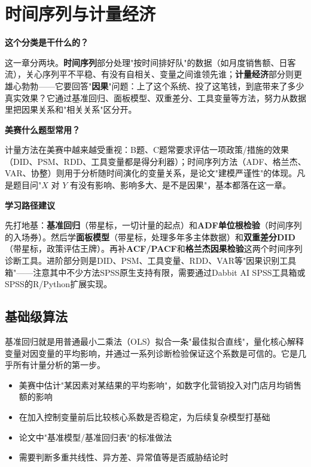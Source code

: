 \chapter{时间序列与计量经济}

\begin{chapteroverview}
\textbf{这个分类是干什么的？}

这一章分两块。\textbf{时间序列}部分处理"按时间排好队"的数据（如月度销售额、日客流），关心序列平不平稳、有没有自相关、变量之间谁领先谁；\textbf{计量经济}部分则更雄心勃勃——它要回答"\textbf{因果}"问题：上了这个系统、投了这笔钱，到底带来了多少真实效果？它通过基准回归、面板模型、双重差分、工具变量等方法，努力从数据里把因果关系和"相关关系"区分开。

\textbf{美赛什么题型常用？}

计量方法在美赛中越来越受重视：B题、C题常要求评估一项政策/措施的效果（DID、PSM、RDD、工具变量都是得分利器）；时间序列方法（ADF、格兰杰、VAR、协整）则用于分析随时间演化的变量关系，是论文"建模严谨性"的体现。凡是题目问"$X$ 对 $Y$ 有没有影响、影响多大、是不是因果"，基本都落在这一章。

\textbf{学习路径建议}

先打地基：\textbf{基准回归}（带星标，一切计量的起点）和\textbf{ADF单位根检验}（时间序列的入场券）。然后学\textbf{面板模型}（带星标，处理多年多主体数据）和\textbf{双重差分DID}（带星标，政策评估王牌）。再补\textbf{ACF/PACF}和\textbf{格兰杰因果检验}这两个时间序列诊断工具。进阶部分则是DID、PSM、工具变量、RDD、VAR等"因果识别工具箱"——注意其中不少方法SPSS原生支持有限，需要通过Dabbit AI SPSS工具箱或SPSS的R/Python扩展实现。
\end{chapteroverview}

\section{基础级算法}


\begin{algointro}
基准回归就是用普通最小二乘法（OLS）拟合一条"最佳拟合直线"，量化核心解释变量对因变量的平均影响，并通过一系列诊断检验保证这个系数是可信的。它是几乎所有计量分析的第一步。
\end{algointro}

\begin{algoscene}
\begin{itemize}
    \item 美赛中估计"某因素对某结果的平均影响"，如数字化营销投入对门店月均销售额的影响
    \item 在加入控制变量前后比较核心系数是否稳定，为后续复杂模型打基础
    \item 论文中"基准模型/基准回归表"的标准做法
    \item 需要判断多重共线性、异方差、异常值等是否威胁结论时
\end{itemize}
\end{algoscene}

